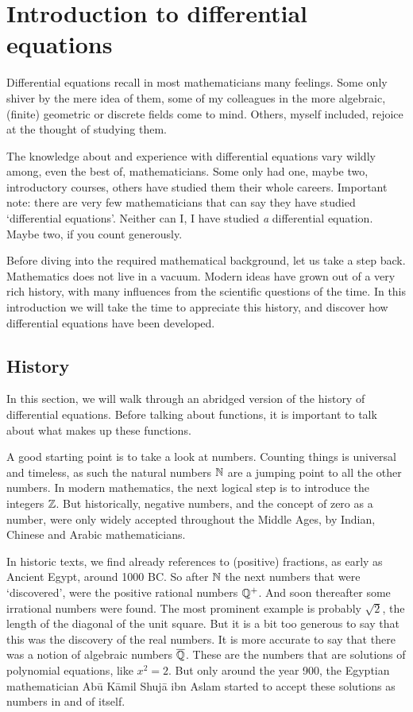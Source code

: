 


\chapter{Introduction to differential equations}

Differential equations recall in most mathematicians many feelings. Some only shiver by the mere idea of them, some of my colleagues in the more algebraic, (finite) geometric or discrete fields come to mind. Others, myself included, rejoice at the thought of studying them.

The knowledge about and experience with differential equations vary wildly among, even the best of, mathematicians. Some only had one, maybe two, introductory courses, others have studied them their whole careers. Important note: there are very few mathematicians that can say they have studied `differential equations'. Neither can I, I have studied \emph{a} differential equation. Maybe two, if you count generously.

Before diving into the required mathematical background, let us take a step back. Mathematics does not live in a vacuum. Modern ideas have grown out of a very rich history, with many influences from the scientific questions of the time. In this introduction we will take the time to appreciate this history, and discover how differential equations have been developed.

\section{History}

In this section, we will walk through an abridged version of the history of differential equations. Before talking about functions, it is important to talk about what makes up these functions.

A good starting point is to take a look at numbers. Counting things is universal and timeless, as such the natural numbers $\mathbb{N}$ are a jumping point to all the other numbers. In modern mathematics, the next logical step is to introduce the integers $\mathbb{Z}$. But historically, negative numbers, and the concept of zero as a number, were only widely accepted throughout the Middle Ages, by Indian, Chinese and Arabic mathematicians.

In historic texts, we find already references to (positive) fractions, as early as Ancient Egypt, around 1000 BC. So after $\mathbb{N}$ the next numbers that were `discovered', were the positive rational numbers $\mathbb{Q}^+$. And soon thereafter some irrational numbers were found. The most prominent example is probably $\sqrt{2}$, the length of the diagonal of the unit square. But it is a bit too generous to say that this was the discovery of the real numbers. It is more accurate to say that there was a notion of algebraic numbers $\overline{\mathbb{Q}}$. These are the numbers that are solutions of polynomial equations, like $x^2 = 2$. But only around the year 900, the Egyptian mathematician Abū Kāmil Shujā ibn Aslam started to accept these solutions as numbers in and of itself.

